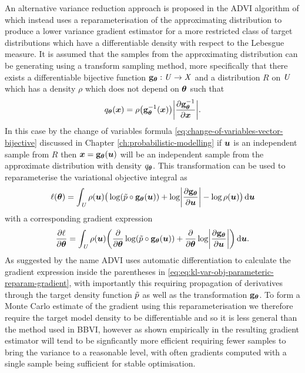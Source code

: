 An alternative variance reduction approach is proposed in the \ac{ADVI} algorithm of \citep{kucukelbir2016automatic} which instead uses a reparameterisation of the approximating distribution to produce a lower variance gradient estimator for a more restricted class of target distributions which have a differentiable density with respect to the Lebesgue measure.  It is assumed that the samples from the approximating distribution can be generating using a transform sampling method, more specifically that there exists a differentiable bijective function ${\mathbf{g}}_{\boldsymbol{\theta}} : \mathit{U} \to \mathit{X}$ and a distribution $R$ on $\mathit{U}$ which has a density $\rho$ which does not depend on $\boldsymbol{\theta}$ such that
\begin{equation}
  q_{\vct{\theta}}(\vct{x}) = \rho\lpa\vctfunc{g}_{\vct{\theta}}^{-1}(\vct{x})\rpa \left|\pd{\vctfunc{g}_{\vct{\theta}}^{-1}}{\vct{x}}\right|.
\end{equation}
In this case by the change of variables formula \eqref{eq:change-of-variables-vector-bijective} discussed in Chapter \ref{ch:probabilistic-modelling} if $\boldsymbol{u}$ is an independent sample from $R$ then $\boldsymbol{x} = {\mathbf{g}}_{\boldsymbol{\theta}}(\boldsymbol{u})$ will be an independent sample from the approximate distribution with density $q_{\boldsymbol{\theta}}$. This transformation can be used to reparameterise the variational objective integral as
\begin{equation}\label{eq:kl-var-obj-parameteric-reparam}
  \ell(\vct{\theta}) = 
  \int_{\set{U}} \rho(\vct{u}) \big(
    \log\lpa\utgtdens\circ\vctfunc{g}_{\vct{\theta}}(\vct{u})\rpa +
    \log\left|\pd{\vctfunc{g}_{\vct{\theta}}}{\vct{u}}\right| - \log\rho(\vct{u})
  \big)
  \,\dr\vct{u}
\end{equation}
with a corresponding gradient expression
\begin{equation}\label{eq:kl-var-obj-parameteric-reparam-gradient}
  \pd{\ell}{\vct{\theta}} = 
  \int_{\set{U}} \rho(\vct{u}) \lpa
    \pd{}{\vct{\theta}}\log\lpa\utgtdens\circ\vctfunc{g}_{\vct{\theta}}(\vct{u})\rpa +
    \pd{}{\vct{\theta}}\log\left|\pd{\vctfunc{g}_{\vct{\theta}}}{\vct{u}}\right|
  \rpa
  \,\dr\vct{u}.
\end{equation}
As suggested by the name \ac{ADVI} uses automatic differentiation to calculate the gradient expression inside the parentheses in \eqref{eq:eq:kl-var-obj-parameteric-reparam-gradient}, with importantly this requiring propagation of derivatives through the target density function $\tilde{p}$ as well as the transformation ${\mathbf{g}}_{\boldsymbol{\theta}}$. To form a Monte Carlo estimate of the gradient using this reparameterisation we therefore require the target model density to be differentiable and so it is less general than the method used in \ac{BBVI}, however as shown empirically in \citep{kucukelbir2016automatic} the resulting gradient estimator will tend to be signficantly more efficient requiring fewer samples to bring the variance to a reasonable level, with often gradients computed with a single sample being sufficient for stable optimisation.

